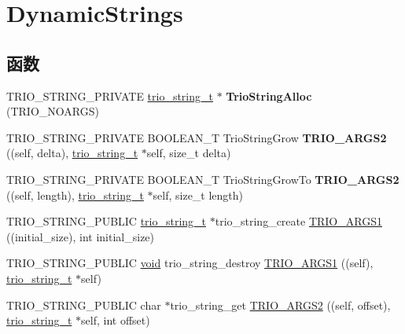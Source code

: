 \hypertarget{group___dynamic_strings}{}\section{Dynamic\+Strings}
\label{group___dynamic_strings}
\subsection*{函数}
\begin{DoxyCompactItemize}
\item 
\mbox{\label{group___dynamic_strings_gaa6f85d7dc1c6cdefcfaf5940358b52f0}} 
T\+R\+I\+O\+\_\+\+S\+T\+R\+I\+N\+G\+\_\+\+P\+R\+I\+V\+A\+TE \hyperlink{struct__trio__string__t}{trio\+\_\+string\+\_\+t} $\ast$ {\bfseries Trio\+String\+Alloc} (T\+R\+I\+O\+\_\+\+N\+O\+A\+R\+GS)
\item 
\mbox{\label{group___dynamic_strings_ga5c7fba43c49aae9ea637539c87b9ab7b}} 
T\+R\+I\+O\+\_\+\+S\+T\+R\+I\+N\+G\+\_\+\+P\+R\+I\+V\+A\+TE B\+O\+O\+L\+E\+A\+N\+\_\+T Trio\+String\+Grow {\bfseries T\+R\+I\+O\+\_\+\+A\+R\+G\+S2} ((self, delta), \hyperlink{struct__trio__string__t}{trio\+\_\+string\+\_\+t} $\ast$self, size\+\_\+t delta)
\item 
\mbox{\label{group___dynamic_strings_ga3192fadad484e1dc17c0f78d0ce2e0b1}} 
T\+R\+I\+O\+\_\+\+S\+T\+R\+I\+N\+G\+\_\+\+P\+R\+I\+V\+A\+TE B\+O\+O\+L\+E\+A\+N\+\_\+T Trio\+String\+Grow\+To {\bfseries T\+R\+I\+O\+\_\+\+A\+R\+G\+S2} ((self, length), \hyperlink{struct__trio__string__t}{trio\+\_\+string\+\_\+t} $\ast$self, size\+\_\+t length)
\item 
T\+R\+I\+O\+\_\+\+S\+T\+R\+I\+N\+G\+\_\+\+P\+U\+B\+L\+IC \hyperlink{struct__trio__string__t}{trio\+\_\+string\+\_\+t} $\ast$trio\+\_\+string\+\_\+create \hyperlink{group___dynamic_strings_gaa88b356493c359ca876cf89cab5bef1e}{T\+R\+I\+O\+\_\+\+A\+R\+G\+S1} ((initial\+\_\+size), int initial\+\_\+size)
\item 
T\+R\+I\+O\+\_\+\+S\+T\+R\+I\+N\+G\+\_\+\+P\+U\+B\+L\+IC \hyperlink{interfacevoid}{void} trio\+\_\+string\+\_\+destroy \hyperlink{group___dynamic_strings_ga57398879c57ffad9cf943c5646b8d652}{T\+R\+I\+O\+\_\+\+A\+R\+G\+S1} ((self), \hyperlink{struct__trio__string__t}{trio\+\_\+string\+\_\+t} $\ast$self)
\item 
T\+R\+I\+O\+\_\+\+S\+T\+R\+I\+N\+G\+\_\+\+P\+U\+B\+L\+IC char $\ast$trio\+\_\+string\+\_\+get \hyperlink{group___dynamic_strings_ga4270a9e7b524425d513dad700305121a}{T\+R\+I\+O\+\_\+\+A\+R\+G\+S2} ((self, offset), \hyperlink{struct__trio__string__t}{trio\+\_\+string\+\_\+t} $\ast$self, int offset)

\end{DoxyCompactItemize}

